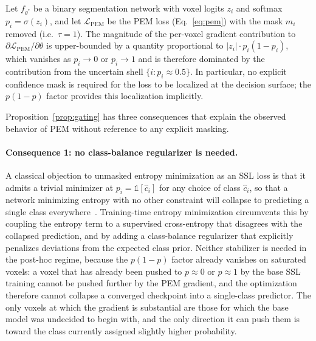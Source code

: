\begin{proposition}
\label{prop:gating}
Let $f_{\theta^*}$ be a binary segmentation network with voxel logits $z_i$ and softmax $p_i\!=\!\sigma(z_i)$, and let $\mathcal{L}_{\mathrm{PEM}}$ be the PEM loss (Eq.~\ref{eq:pem}) with the mask $m_i$ removed (i.e.\ $\tau\!=\!1$). The magnitude of the per-voxel gradient contribution to $\partial \mathcal{L}_{\mathrm{PEM}}/\partial \theta$ is upper-bounded by a quantity proportional to $|z_i|\cdot p_i(1{-}p_i)$, which vanishes as $p_i\!\to\!0$ or $p_i\!\to\!1$ and is therefore dominated by the contribution from the uncertain shell $\{i : p_i\!\approx\!0.5\}$. In particular, no explicit confidence mask is required for the loss to be localized at the decision surface; the $p(1{-}p)$ factor provides this localization implicitly.
\end{proposition}

Proposition~\ref{prop:gating} has three consequences that explain the observed behavior of PEM without reference to any explicit masking.

\paragraph{Consequence 1: no class-balance regularizer is needed.}
A classical objection to unmasked entropy minimization as an SSL loss is that it admits a trivial minimizer at $p_i\!=\!\mathbb{1}[\hat c_i]$ for any choice of class $\hat c_i$, so that a network minimizing entropy with no other constraint will collapse to predicting a single class everywhere~\cite{grandvalet2004entropy}. Training-time entropy minimization circumvents this by coupling the entropy term to a supervised cross-entropy that disagrees with the collapsed prediction, and by adding a class-balance regularizer that explicitly penalizes deviations from the expected class prior. Neither stabilizer is needed in the post-hoc regime, because the $p(1{-}p)$ factor already vanishes on saturated voxels: a voxel that has already been pushed to $p\!\approx\!0$ or $p\!\approx\!1$ by the base SSL training cannot be pushed further by the PEM gradient, and the optimization therefore cannot collapse a converged checkpoint into a single-class predictor. The only voxels at which the gradient is substantial are those for which the base model was undecided to begin with, and the only direction it can push them is toward the class currently assigned slightly higher probability.

